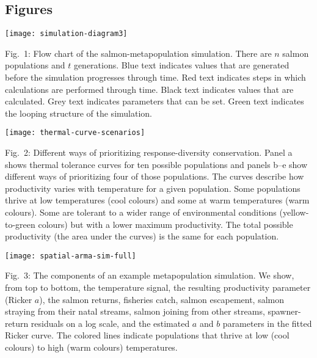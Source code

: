 \documentclass[11pt]{article}
\begin{document}
\begin{spacing}{1.4}

\clearpage

\section{Figures}

\begin{center}
\texttt{[image: simulation-diagram3]}
\end{center}
Fig.\ 1: Flow chart of the salmon-metapopulation simulation. There are $n$ salmon populations and $t$ generations. Blue text indicates values that are generated before the simulation progresses through time. Red text indicates steps in which calculations are performed through time. Black text indicates values that are calculated. Grey text indicates parameters that can be set. Green text indicates the looping structure of the simulation.

\clearpage

\begin{center}
\texttt{[image: thermal-curve-scenarios]}
\end{center}
Fig.\ 2: Different ways of prioritizing response-diversity conservation. Panel a shows thermal tolerance curves for ten possible populations and panels b--e show different ways of prioritizing four of those populations. The curves describe how productivity varies with temperature for a given population. Some populations thrive at low temperatures (cool colours) and some at warm temperatures (warm colours). Some are tolerant to a wider range of environmental conditions (yellow-to-green colours) but with a lower maximum productivity. The total possible productivity (the area under the curves) is the same for each population.

\clearpage

\begin{center}
\texttt{[image: spatial-arma-sim-full]}
\end{center}
Fig.\ 3: The components of an example metapopulation simulation. We show, from top to bottom, the temperature signal, the resulting productivity parameter (Ricker $a$), the salmon returns, fisheries catch, salmon escapement, salmon straying from their natal streams, salmon joining from other streams, spawner-return residuals on a log scale, and the estimated $a$ and $b$ parameters in the fitted Ricker curve. The colored lines indicate populations that thrive at low (cool colours) to high (warm colours) temperatures.


\end{spacing}
\end{document}
